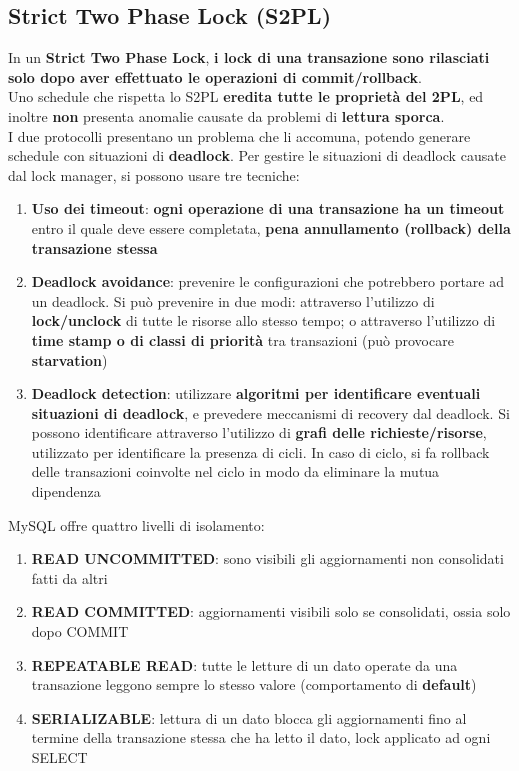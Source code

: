 \documentclass{article}
\begin{document}
\subsection*{Strict Two Phase Lock (S2PL)}
\large

In un \textbf{Strict Two Phase Lock}, \textbf{i lock di una transazione sono rilasciati solo dopo aver effettuato le operazioni di commit/rollback}.\\
Uno schedule che rispetta lo S2PL \textbf{eredita tutte le proprietà del 2PL}, ed inoltre \textbf{non} presenta anomalie causate da problemi di \textbf{lettura sporca}.\vspace{14pt}\\
I due protocolli presentano un problema che li accomuna, potendo generare schedule con situazioni di \textbf{deadlock}. Per gestire le situazioni di deadlock causate dal lock manager, si possono usare tre tecniche:
\begin{enumerate}[leftmargin=1cm]
    \item \textbf{Uso dei timeout}: \textbf{ogni operazione di una transazione ha un timeout} entro il quale deve essere completata, \textbf{pena annullamento (rollback) della transazione stessa}
    \item \textbf{Deadlock avoidance}: prevenire le configurazioni che potrebbero portare ad un deadlock. Si può prevenire in due modi: attraverso l'utilizzo di \textbf{lock/unclock} di tutte le risorse allo stesso tempo; o attraverso l'utilizzo di \textbf{time stamp o di classi di priorità} tra transazioni (può provocare \textbf{starvation})
    \item \textbf{Deadlock detection}: utilizzare \textbf{algoritmi per identificare eventuali situazioni di deadlock}, e prevedere meccanismi di recovery dal deadlock. Si possono identificare attraverso l'utilizzo di \textbf{grafi delle richieste/risorse}, utilizzato per identificare la presenza di cicli. In caso di ciclo, si fa rollback delle transazioni coinvolte nel ciclo in modo da eliminare la mutua dipendenza\\
\end{enumerate}
MySQL offre quattro livelli di isolamento:
\begin{enumerate}[label={-}, leftmargin=1cm]
    \item \textbf{READ UNCOMMITTED}: sono visibili gli aggiornamenti non consolidati fatti da altri
    \item \textbf{READ COMMITTED}: aggiornamenti visibili solo se consolidati, ossia solo dopo COMMIT
    \item \textbf{REPEATABLE READ}: tutte le letture di un dato operate da una transazione leggono sempre lo stesso valore (comportamento di \textbf{default})
    \item \textbf{SERIALIZABLE}: lettura di un dato blocca gli aggiornamenti fino al termine della transazione stessa che ha letto il dato, lock applicato ad ogni SELECT\\
\end{enumerate}
\end{document}
